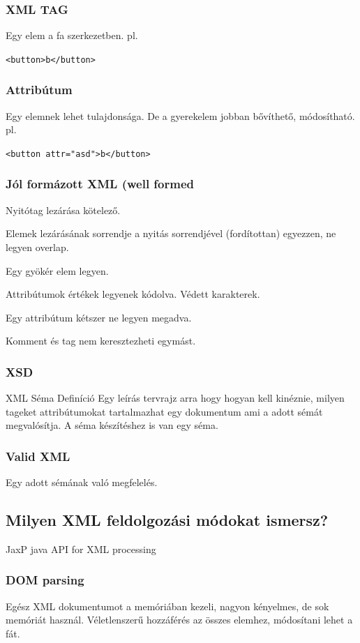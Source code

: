 \documentclass[a4paper,14pt]{extarticle}
\def\code#1{
	\begin{alltt}
	\texttt{#1}
	\end{alltt}
}
\begin{document}
			\subsubsection{XML TAG}
			Egy elem a fa szerkezetben.
			pl. \code{<button>b</button>} 
			\subsubsection{Attribútum}
			Egy elemnek lehet tulajdonsága.
			De a gyerekelem jobban bővíthető, módosítható.
			pl. \code{<button attr="asd">b</button>}
			\subsubsection{Jól formázott XML (well formed}
				\begin{compactitem}
					\item Nyitótag lezárása kötelező.
					\item Elemek lezárásának sorrendje a nyitás sorrendjével (fordítottan) egyezzen, ne legyen overlap.
					\item Egy gyökér elem legyen.
					\item Attribútumok értékek legyenek kódolva. Védett karakterek.
					\item Egy attribútum kétszer ne legyen megadva.
					\item Komment és tag nem keresztezheti egymást.
				\end{compactitem}
		
			\subsubsection{XSD}
				XML Séma Definíció 
				\newline Egy leírás tervrajz arra hogy hogyan kell kinéznie, milyen tageket attribútumokat tartalmazhat egy dokumentum ami a adott sémát megvalósítja.
				A séma készítéshez is van egy séma.
			\subsubsection{Valid XML}
				Egy adott sémának való megfelelés.
		\subsection{Milyen XML feldolgozási módokat ismersz?}
		JaxP java API for XML processing
			\subsubsection{DOM parsing}
				Egész XML dokumentumot a memóriában kezeli, nagyon kényelmes, de sok memóriát használ.
				Véletlenszerű hozzáférés az összes elemhez, módosítani lehet a fát. 
\end{document}
